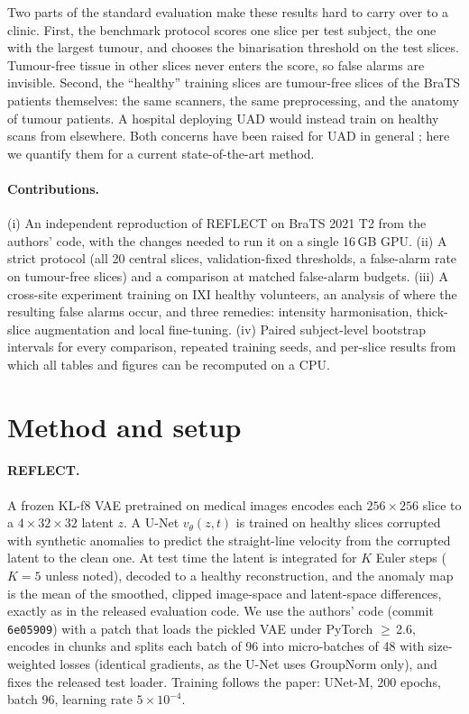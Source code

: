\documentclass[10pt]{article}
\begin{document}
Two parts of the standard evaluation make these results hard to carry over to a clinic.
First, the benchmark protocol scores one slice per test subject, the one with the largest tumour, and chooses the binarisation threshold on the test slices.
Tumour-free tissue in other slices never enters the score, so false alarms are invisible.
Second, the ``healthy'' training slices are tumour-free slices of the BraTS patients themselves: the same scanners, the same preprocessing, and the anatomy of tumour patients.
A hospital deploying UAD would instead train on healthy scans from elsewhere.
Both concerns have been raised for UAD in general \citep{meissen2022pitfalls,bercea2023aes,lagogiannis2024deepdive,reinke2024pitfalls}; here we quantify them for a current state-of-the-art method.

\paragraph{Contributions.}
(i) An independent reproduction of REFLECT on BraTS 2021 T2 from the authors' code, with the changes needed to run it on a single 16\,GB GPU.
(ii) A strict protocol (all 20 central slices, validation-fixed thresholds, a false-alarm rate on tumour-free slices) and a comparison at matched false-alarm budgets.
(iii) A cross-site experiment training on IXI healthy volunteers, an analysis of where the resulting false alarms occur, and three remedies: intensity harmonisation, thick-slice augmentation and local fine-tuning.
(iv) Paired subject-level bootstrap intervals for every comparison, repeated training seeds, and per-slice results from which all tables and figures can be recomputed on a CPU.

\section{Method and setup}
\paragraph{REFLECT.}
A frozen KL-f8 VAE pretrained on medical images encodes each $256\times256$ slice to a $4\times32\times32$ latent $z$.
A U-Net $v_\theta(z,t)$ is trained on healthy slices corrupted with synthetic anomalies to predict the straight-line velocity from the corrupted latent to the clean one.
At test time the latent is integrated for $K$ Euler steps ($K=5$ unless noted), decoded to a healthy reconstruction, and the anomaly map is the mean of the smoothed, clipped image-space and latent-space differences, exactly as in the released evaluation code.
We use the authors' code (commit \texttt{6e05909}) with a patch that loads the pickled VAE under PyTorch $\ge$\,2.6, encodes in chunks and splits each batch of 96 into micro-batches of 48 with size-weighted losses (identical gradients, as the U-Net uses GroupNorm only), and fixes the released test loader.
Training follows the paper: UNet-M, 200 epochs, batch 96, learning rate $5\times10^{-4}$.
\end{document}
